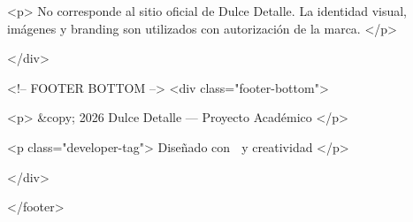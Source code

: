         <p>
            No corresponde al sitio oficial de Dulce Detalle.
            La identidad visual, imágenes y branding son utilizados
            con autorización de la marca.
        </p>

    </div>

    <!-- FOOTER BOTTOM -->
    <div class="footer-bottom">

        <p>
            &copy; 2026 Dulce Detalle — Proyecto Académico
        </p>

        <p class="developer-tag">
            Diseñado con 💜 y creatividad
        </p>

    </div>

</footer>
